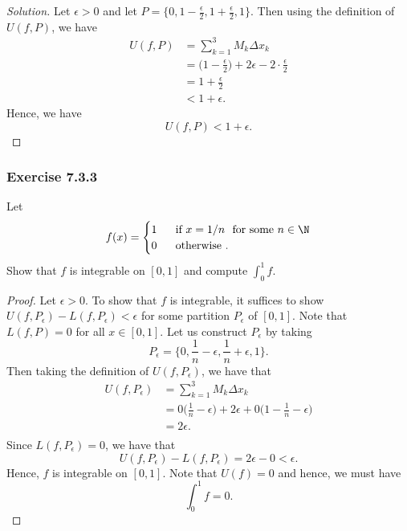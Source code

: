 \begin{enumerate}
		\begin{proof}[Solution]
		Let \( \epsilon > 0  \) and let \( P = \{ 0, 1 - \frac{ \epsilon  }{ 2 } , 1 + \frac{ \epsilon  }{ 2 }, 1  \}  \). Then using the definition of \( U(f,P)  \), we have
		\begin{align*}
		    U(f,P) &= \sum_{ k=1 }^{ 3 } M_{k } \Delta x_{ k }  \\
				   &= \Big( 1 - \frac{ \epsilon  }{ 2 }  \Big) + 2 \epsilon - 2 \cdot \frac{ \epsilon  }{ 2 } \\
				   &= 1 + \frac{ \epsilon  }{ 2 } \\
				   &< 1 + \epsilon. 
		\end{align*}
		Hence, we have 
		\[ U(f,P) < 1 + \epsilon. \]

		\end{proof}
\end{enumerate}


\subsubsection{Exercise 7.3.3} Let 
\[  f(x) = 
\begin{cases}
	1 \ &\text{ if } x = 1 / n \ \text{ for some } n \in \N \\
	0 \ &\text{ otherwise }.
\end{cases}  \]
Show that \( f  \) is integrable on \( [0,1]  \) and compute \( \int_{ 0 }^{ 1 }  f . \)
\begin{proof}
	Let \( \epsilon > 0  \). To show that \( f  \) is integrable, it suffices to show \( U(f, P_{\epsilon }) - L(f, P_{\epsilon }) < \epsilon  \) for some partition \( P_{\epsilon } \) of \( [0,1] \). Note that \( L(f, P ) = 0  \) for all \( x \in [0,1] \). Let us construct \( P_{\epsilon } \) by taking 
	\[  P_{\epsilon } = \Big\{ 0 , \frac{ 1 }{ n } - \epsilon , \frac{ 1 }{ n }  + \epsilon , 1  \Big\}. \]
	Then taking the definition of \( U(f,P_{\epsilon })  \), we have that 
	\begin{align*}
	    U(f,P_{\epsilon }) &= \sum_{ k=1 }^{ 3 } M_{k } \Delta x_{k }   \\
						   &= 0 \Big( \frac{ 1 }{ n }  - \epsilon \Big) + 2 \epsilon  + 0 \Big( 1 - \frac{ 1 }{ n } - \epsilon  \Big) \\
						   &= 2 \epsilon. \\
	\end{align*}
	Since \( L(f, P_{\epsilon }) = 0  \), we have that 
	\[  U(f, P_{\epsilon }) - L(f, P_{\epsilon }) = 2 \epsilon - 0  < \epsilon.  \]
	Hence, \( f  \) is integrable on \( [0,1] \). Note that \( U(f) = 0  \) and hence, we must have 
	\[  \int_{ 0 }^{ 1 } f = 0. \]
\end{proof}

